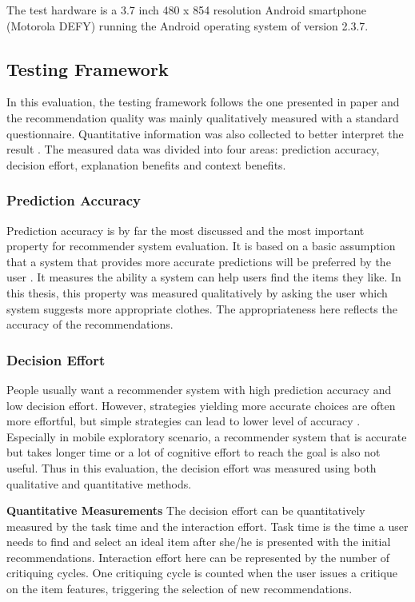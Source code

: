 The test hardware is a 3.7 inch 480 x 854 resolution Android smartphone (Motorola DEFY) running the Android operating system of version 2.3.7.

\subsection{Testing Framework} \label{sec:ts_tf}

In this evaluation, the testing framework follows the one presented in paper \cite{ref:5} and the recommendation quality was mainly qualitatively measured with a standard questionnaire. Quantitative information was also collected to better interpret the result \cite{ref:35, ref:46}. The measured data was divided into four areas: prediction accuracy, decision effort, explanation benefits and context benefits.

\subsubsection{Prediction Accuracy} \label{sec:ts_tf_pa}

Prediction accuracy is by far the most discussed and the most important property for recommender system evaluation. It is based on a basic assumption that a system that provides more accurate predictions will be preferred by the user \cite{ref:35}. It measures the ability a system can help users find the items they like. In this thesis, this property was measured qualitatively by asking the user which system suggests more appropriate clothes. The appropriateness here reflects the accuracy of the recommendations. 

\subsubsection{Decision Effort} \label{sec:ts_tf_de}

People usually want a recommender system with high prediction accuracy and low decision effort. However, strategies yielding more accurate choices are often more effortful, but simple strategies can lead to lower level of accuracy \cite{ref:38}. Especially in mobile exploratory scenario, a recommender system that is accurate but takes longer time or a lot of cognitive effort to reach the goal is also not useful. Thus in this evaluation, the decision effort was measured using both qualitative and quantitative methods.

\textbf{Quantitative Measurements} The decision effort can be quantitatively measured by the task time and the interaction effort. Task time is the time a user needs to find and select an ideal item after she/he is presented with the initial recommendations. Interaction effort here can be represented by the number of critiquing cycles. One critiquing cycle is counted when the user issues a critique on the item features, triggering the selection of new recommendations.

